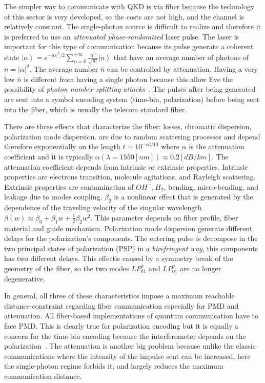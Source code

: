 
The simpler way to communicate with QKD is via fiber because the technology of this sector is very developed, so the costs are not high, and the channel is relatively constant. The single-photon source is difficult to realize and therefore it is preferred to use an \textit{attenuated phase-randomized} laser pulse. The laser is important for this type of communication because its pulse generate a coherent state $\left|\alpha\right> = e^{- |\alpha|^2 / 2} \sum_{n=0}^{+\infty} \frac{\alpha^n}{\sqrt{n!}} \left|n\right>$ that have an average number of photons of $\bar{n} = |\alpha|^2$. The average number $\bar{n}$ can be controlled by attenuation. Having a very low $\bar{n}$ is different from having a single photon because this allow Eve the possibility of \textit{photon number splitting attacks}~\cite{a24}. The pulses after being generated are sent into a symbol encoding system (time-bin, polarization) before being sent into the fiber, which is usually the telecom standard fiber.

There are three effects that characterize the fiber: losses, chromatic dispersion, polarization mode dispersion.  are due to random scattering processes and depend therefore exponentially on the length $t = 10^{-\alpha l / 10}$ where $\alpha$ is the attenuation coefficient and it is typically $\alpha(\lambda = 1550[nm]) \approx 0.2 [dB / km]$. The attenuation coefficient depends from intrinsic or extrinsic properties. Intrinsic properties are electrons transition, molecule agitations, and Rayleigh scattering. Extrinsic properties are contamination of $OH^-, H_2$, bending, micro-bending, and leakage due to modes coupling.  $\beta_2$ is a nonlinear effect that is generated by the dependence of the traveling velocity of the singular wavelength $\beta(w) \approx \beta_0 + \beta_1 w + \frac{1}{2} \beta_2 w^2$. This parameter depends on fiber profile, fiber material and guide mechanism. Polarization mode dispersion  generate different delays for the polarization's components. The entering pulse is decompose in the two principal states of polarization (PSP) in a \textit{birefringent way}, this components has two different delays. This effectis caused by a symmetry break of the geometry of the fiber, so the two modes $LP_{01}^x$ and $LP_{01}^y$ are no longer degenerative.

In general, all three of these characteristics impose a maximum reachable distance-constraint regarding fiber communication especially for PMD and attenuation. All fiber-based implementations of quantum communication have to face PMD. This is clearly true for polarization encoding but it is equally a concern for the time-bin encoding because the interferometer depends on the polarization~\cite{a25}. The attenuation is another big problem because unlike the classic communications where the intensity of the impulse sent can be increased, here the single-photon regime forbids it, and largely reduces the maximum communication distance.

